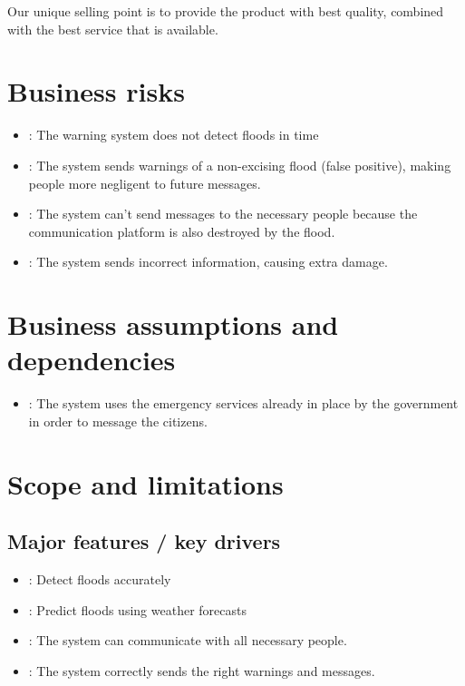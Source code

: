 Our unique selling point is to provide the product with best quality, combined with the best service that is available.

\section{Business risks}
\begin{itemize}
	\item {}: The warning system does not detect floods in time
	\item {}: The system sends warnings of a non-excising flood (false positive), making people more negligent to future messages.
	\item {}: The system can't send messages to the necessary people because the communication platform is also destroyed by the flood.
	\item {}: The system sends incorrect information, causing extra damage.
\end{itemize}

\section{Business assumptions and dependencies}
\begin{itemize}
	\item {}: The system uses the emergency services already in place by the government in order to message the citizens.
	
\end{itemize}

\section{Scope and limitations}
\subsection{Major features / key drivers}
\begin{itemize}
	\item {}: Detect floods accurately
	\item {}: Predict floods using weather forecasts
	\item {}: The system can communicate with all necessary people.
	\item {}: The system correctly sends the right warnings and messages.
		
\end{itemize}
